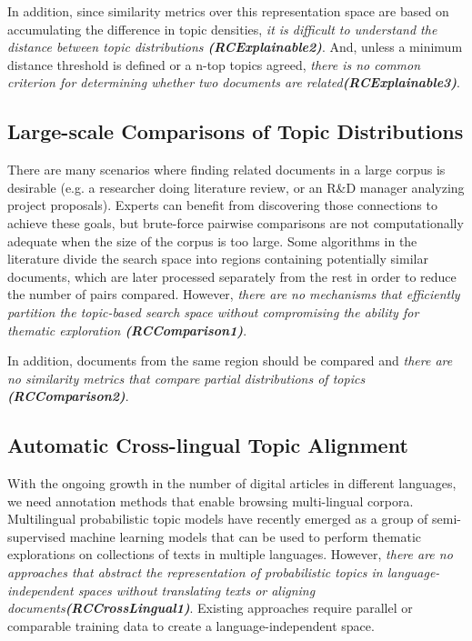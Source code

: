 In addition, since similarity metrics over this representation space are based on accumulating the difference in topic densities, \textit{it is difficult to understand the distance between topic distributions \textbf{(RCExplainable2)}}. And, unless a minimum distance threshold is defined or a n-top topics agreed, \textit{there is no common criterion for determining whether two documents are related\textbf{(RCExplainable3)}}.  


\subsection{Large-scale Comparisons of Topic Distributions}

There are many scenarios where finding related documents in a large corpus is desirable (e.g. a researcher doing literature review, or an R\&D  manager analyzing project proposals). Experts can benefit from discovering those connections to achieve these goals, but brute-force pairwise comparisons are not computationally adequate when the size of the corpus is too large. Some algorithms in the literature divide the search space into regions containing potentially similar documents, which are later processed separately from the rest in order to reduce the number of pairs compared. However, \textit{there are no mechanisms that efficiently partition the topic-based search space without compromising the ability for thematic exploration \textbf{(RCComparison1)}}.

In addition, documents from the same region should be compared and \textit{there are no similarity metrics that compare partial distributions of topics \textbf{(RCComparison2)}}.


\subsection{Automatic Cross-lingual Topic Alignment}

With the ongoing growth in the number of digital articles in different languages, we need annotation methods that enable browsing multi-lingual corpora. Multilingual probabilistic topic models have recently emerged as a group of semi-supervised machine learning models that can be used to perform thematic explorations on collections of texts in multiple languages. However, \textit{there are no approaches that abstract the representation of probabilistic topics in language-independent spaces without translating texts or aligning documents\textbf{(RCCrossLingual1)}}. Existing approaches require parallel or comparable training data to create a language-independent space. 

